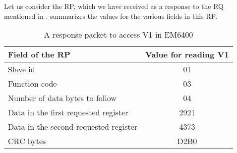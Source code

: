 Let us consider the RP, which we have received as a response to the RQ mentioned 
in .  summarizes the values for the 
various fields in this RP.  
\begin{table}
  \centering
  \caption{A response packet to access V1 in EM6400}
  \label{tab:params-rp}
  \begin{tabular}{lc}\hline
    Field of the RP                       & Value for reading V1 \\ \hline 
    Slave id                              & 01                   \\
    Function code                         & 03                   \\ 
    Number of data bytes to follow        & 04                   \\
    Data in the first requested register  & 2921                 \\
    Data in the second requested register & 4373                 \\ 
    CRC bytes                             & D2B0                 \\
    \hline 
  \end{tabular}
\end{table}
